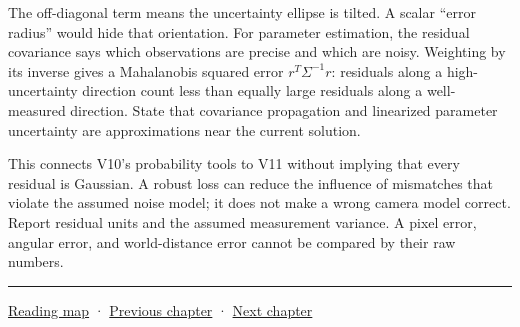 The off-diagonal term means the uncertainty ellipse is tilted. A scalar ``error radius'' would hide that orientation. For parameter estimation, the residual covariance says which observations are precise and which are noisy. Weighting by its inverse gives a Mahalanobis squared error \(r^T\Sigma^{-1}r\): residuals along a high-uncertainty direction count less than equally large residuals along a well-measured direction. State that covariance propagation and linearized parameter uncertainty are approximations near the current solution.

This connects V10's probability tools to V11 without implying that every residual is Gaussian. A robust loss can reduce the influence of mismatches that violate the assumed noise model; it does not make a wrong camera model correct. Report residual units and the assumed measurement variance. A pixel error, angular error, and world-distance error cannot be compared by their raw numbers.

\begin{center}\rule{0.5\linewidth}{0.5pt}\end{center}

\hyperref[volume-reading-map]{Reading map} · \hyperref[02-foundations-ii-ch033-projection-clipping-and-raster-sampling]{Previous chapter} · \hyperref[02-foundations-ii-ch035-camera-extrinsics-and-projection-geometry]{Next chapter}
